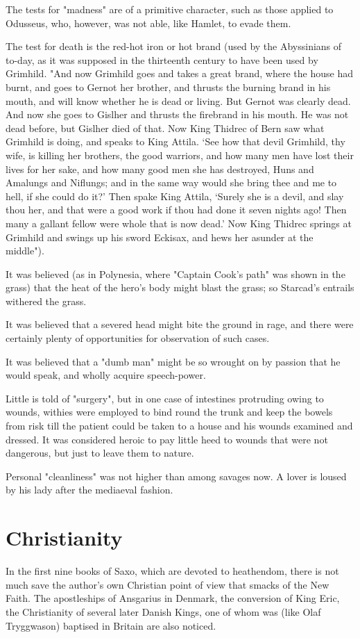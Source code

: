 \documentclass[10pt,a4paper]{report}
\begin{document}
The tests for "madness" are of a primitive character, such as those applied to Odusseus, who, however, was not able, like Hamlet, to evade them.

The test for death is the red-hot iron or hot brand (used by the Abyssinians of to-day, as it was supposed in the thirteenth century to have been used by Grimhild. "And now Grimhild goes and takes a great brand, where the house had burnt, and goes to Gernot her brother, and thrusts the burning brand in his mouth, and will know whether he is dead or living. But Gernot was clearly dead. And now she goes to Gislher and thrusts the firebrand in his mouth. He was not dead before, but Gislher died of that. Now King Thidrec of Bern saw what Grimhild is doing, and speaks to King Attila. `See how that devil Grimhild, thy wife, is killing her brothers, the good warriors, and how many men have lost their lives for her sake, and how many good men she has destroyed, Huns and Amalungs and Niflungs; and in the same way would she bring thee and me to hell, if she could do it?' Then spake King Attila, `Surely she is a devil, and slay thou her, and that were a good work if thou had done it seven nights ago! Then many a gallant fellow were whole that is now dead.' Now King Thidrec springs at Grimhild and swings up his sword Eckisax, and hews her asunder at the middle").

It was believed (as in Polynesia, where "Captain Cook's path" was shown in the grass) that the heat of the hero's body might blast the grass; so Starcad's entrails withered the grass.

It was believed that a severed head might bite the ground in rage, and there were certainly plenty of opportunities for observation of such cases.

It was believed that a "dumb man" might be so wrought on by passion that he would speak, and wholly acquire speech-power.

Little is told of "surgery", but in one case of intestines protruding owing to wounds, withies were employed to bind round the trunk and keep the bowels from risk till the patient could be taken to a house and his wounds examined and dressed. It was considered heroic to pay little heed to wounds that were not dangerous, but just to leave them to nature.

Personal "cleanliness" was not higher than among savages now. A lover is loused by his lady after the mediaeval fashion.

\chapter{Christianity}
In the first nine books of Saxo, which are devoted to heathendom, there is not much save the author's own Christian point of view that smacks of the New Faith. The apostleships of Ansgarius in Denmark, the conversion of King Eric, the Christianity of several later Danish Kings, one of whom was (like Olaf Tryggwason) baptised in Britain are also noticed.
\end{document}
